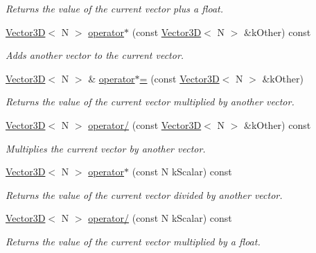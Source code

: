 \begin{DoxyCompactItemize}
\begin{DoxyCompactList}\small\item\em Returns the value of the current vector plus a float. \end{DoxyCompactList}\item 
\hyperlink{class_vector3_d}{Vector3\+D}$<$ N $>$ \hyperlink{class_vector3_d_aa4ea93d3a84407ba621cdfb035592302}{operator$\ast$} (const \hyperlink{class_vector3_d}{Vector3\+D}$<$ N $>$ \&k\+Other) const 
\begin{DoxyCompactList}\small\item\em Adds another vector to the current vector. \end{DoxyCompactList}\item 
\hyperlink{class_vector3_d}{Vector3\+D}$<$ N $>$ \& \hyperlink{class_vector3_d_a393c3f60e01027934288918874145bbb}{operator$\ast$=} (const \hyperlink{class_vector3_d}{Vector3\+D}$<$ N $>$ \&k\+Other)
\begin{DoxyCompactList}\small\item\em Returns the value of the current vector multiplied by another vector. \end{DoxyCompactList}\item 
\hyperlink{class_vector3_d}{Vector3\+D}$<$ N $>$ \hyperlink{class_vector3_d_a2d4d0cbc6bf028d71e1f78f5937c7f6d}{operator/} (const \hyperlink{class_vector3_d}{Vector3\+D}$<$ N $>$ \&k\+Other) const 
\begin{DoxyCompactList}\small\item\em Multiplies the current vector by another vector. \end{DoxyCompactList}\item 
\hyperlink{class_vector3_d}{Vector3\+D}$<$ N $>$ \hyperlink{class_vector3_d_ab83dcb3a0944eb24f08e2e5e49a50a81}{operator$\ast$} (const N k\+Scalar) const 
\begin{DoxyCompactList}\small\item\em Returns the value of the current vector divided by another vector. \end{DoxyCompactList}\item 
\hyperlink{class_vector3_d}{Vector3\+D}$<$ N $>$ \hyperlink{class_vector3_d_a139ffe885d7d5d86a3f8e534e701d261}{operator/} (const N k\+Scalar) const 
\begin{DoxyCompactList}\small\item\em Returns the value of the current vector multiplied by a float. \end{DoxyCompactList}\item 

\end{DoxyCompactItemize}
